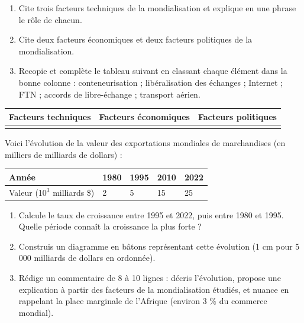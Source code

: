 \documentclass[11pt]{article}
\begin{document}
\begin{exercice}
\begin{enumerate}
\item Cite trois facteurs techniques de la mondialisation et explique en une phrase le rôle de chacun.
\item Cite deux facteurs économiques et deux facteurs politiques de la mondialisation.
\item Recopie et complète le tableau suivant en classant chaque élément dans la bonne colonne : conteneurisation ; libéralisation des échanges ; Internet ; FTN ; accords de libre-échange ; transport aérien.
\end{enumerate}
\begin{center}
\begin{tabularx}{\linewidth}{|X|X|X|}
\hline
\rowcolor{popblueL} Facteurs techniques & Facteurs économiques & Facteurs politiques \\
\hline
 & & \\
\hline
\end{tabularx}
\end{center}
\end{exercice}

\begin{exercice}
Voici l'évolution de la valeur des exportations mondiales de marchandises (en milliers de milliards de dollars) :
\begin{center}
\begin{tabularx}{\linewidth}{|l|X|X|X|X|}
\hline
\rowcolor{popblueL} Année & 1980 & 1995 & 2010 & 2022 \\
\hline
Valeur (10$^3$ milliards \$) & 2 & 5 & 15 & 25 \\
\hline
\end{tabularx}
\end{center}
\begin{enumerate}
\item Calcule le taux de croissance entre 1995 et 2022, puis entre 1980 et 1995. Quelle période connaît la croissance la plus forte ?
\item Construis un diagramme en bâtons représentant cette évolution (1 cm pour 5 000 milliards de dollars en ordonnée).
\item Rédige un commentaire de 8 à 10 lignes : décris l'évolution, propose une explication à partir des facteurs de la mondialisation étudiés, et nuance en rappelant la place marginale de l'Afrique (environ 3 \% du commerce mondial).
\end{enumerate}
\end{exercice}
\end{document}
